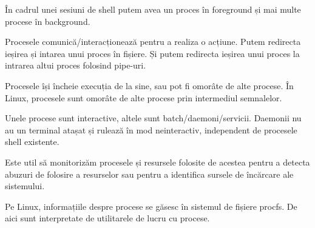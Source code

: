 În cadrul unei sesiuni de shell putem avea un proces în foreground și mai multe
procese în background.

Procesele comunică/interacționează pentru a realiza o acțiune. Putem redirecta
ieșirea și intarea unui proces în fișiere. Și putem redirecta ieșirea unui
proces la intrarea altui proces folosind pipe-uri.

Procesele își încheie execuția de la sine, sau pot fi omorâte de alte procese.
În Linux, procesele sunt omorâte de alte procese prin intermediul semnalelor.

Unele procese sunt interactive, altele sunt batch/daemoni/servicii. Daemonii nu
au un terminal atașat și rulează în mod neinteractiv, independent de procesele
shell existente.

Este util să monitorizăm procesele și resursele folosite de acestea pentru a
detecta abuzuri de folosire a resurselor sau pentru a identifica sursele de
încărcare ale sistemului.

Pe Linux, informațiile despre procese se găsesc în sistemul de fișiere procfs. De
aici sunt interpretate de utilitarele de lucru cu procese.
